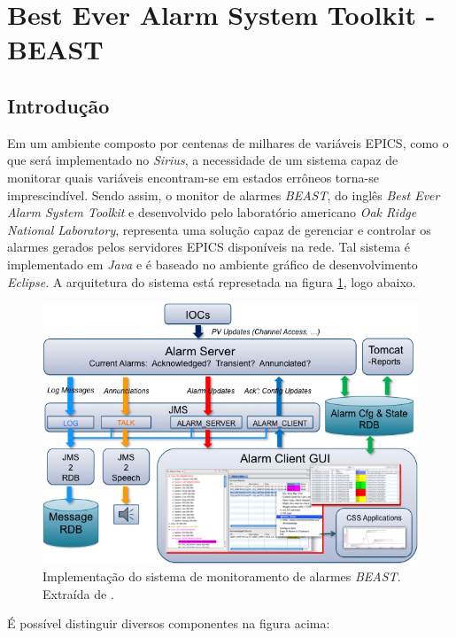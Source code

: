 \section {Best Ever Alarm System Toolkit - BEAST}

\subsection {Introdução} \label{beast-intro}

Em um ambiente composto por centenas de milhares de variáveis EPICS, como o que
será implementado no \textit{Sirius}, a necessidade de um sistema capaz de
monitorar quais variáveis encontram-se em estados errôneos torna-se
imprescindível. Sendo assim, o monitor de alarmes \textit{BEAST}, do inglês
\textit{Best Ever Alarm System Toolkit} e desenvolvido pelo laboratório
americano \textit{Oak Ridge National Laboratory}, representa uma solução capaz
de gerenciar e controlar os alarmes gerados pelos servidores EPICS disponíveis
na rede. Tal sistema é implementado em \textit{Java} e é baseado no ambiente
gráfico de desenvolvimento \textit{Eclipse}. A arquitetura do sistema
está represetada na figura \ref{fig:best_arquitetura}, logo abaixo.

\begin{figure}[h]

\centering
\includegraphics[scale=0.40]{image/beast-arquitetura}
\caption {Implementação do sistema de monitoramento de alarmes
\textit{BEAST}. Extraída de \cite{beast}.}
\label{fig:best_arquitetura}
\end{figure}

É possível distinguir diversos componentes na figura acima:


